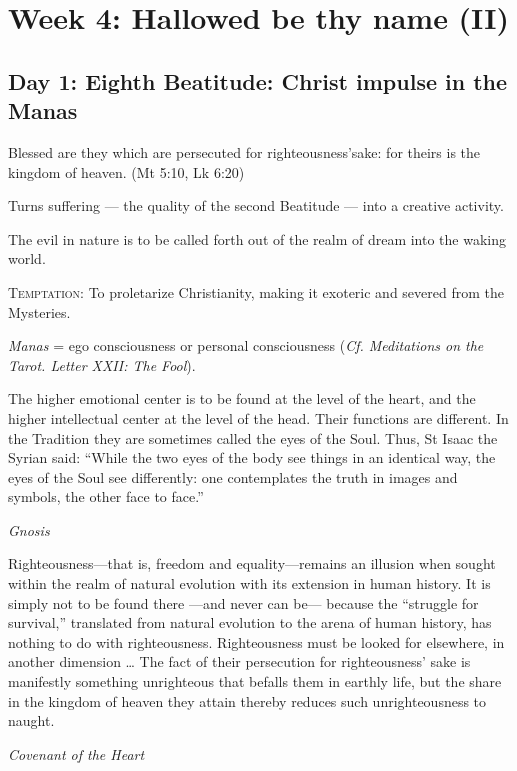 \section{Week 4: Hallowed be thy name (II)}

\subsection*{Day 1: Eighth Beatitude: Christ impulse in the Manas}
Blessed are they which are persecuted for righteousness'sake: for theirs is the kingdom of heaven.
(Mt 5:10, Lk 6:20)

Turns suffering — the quality of the second Beatitude — into a creative
activity.

The evil in nature is to be called forth out of the realm of dream into the waking world.

\textsc{Temptation}: To proletarize Christianity, making it exoteric and severed from the Mysteries.

\emph{Manas} = ego consciousness or personal consciousness (\emph{Cf. Meditations on the Tarot. Letter XXII: The Fool}).

\begin{quotationx}
The higher emotional center is to be found at the level of the heart, and the higher intellectual center at the level of
the head. Their functions are different. In the Tradition they are sometimes called the eyes of the Soul. Thus, St
Isaac the Syrian said: “While the two eyes of the body see things in an identical way, the eyes of the Soul see
differently: one contemplates the truth in images and symbols, the other face to face.” 
\begin{flushright}\textit{Gnosis}\end{flushright}

Righteousness—that is, freedom and equality—remains an illusion when sought
within the realm of natural evolution with its extension in human history. It is simply not to be found
there —and never can be— because the “struggle for survival,” translated from
natural evolution to the arena of human history, has nothing to do with righteousness. Righteousness must be looked for
elsewhere, in another dimension … The fact of their persecution for righteousness' sake is
manifestly something unrighteous that befalls them in earthly life, but the share in the kingdom of heaven they attain
thereby reduces such unrighteousness to naught.
\begin{flushright}\textit{Covenant of the Heart}\end{flushright}

\end{quotationx}

